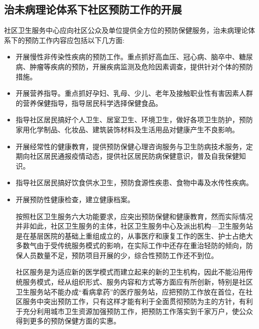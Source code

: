 \subsection{治未病理论体系下社区预防工作的开展}
社区卫生服务中心应向社区公众及单位提供全方位的预防保健服务，治未病理论体系下的预防工作内容应包括以下几方面:
\begin{itemize}
\item 开展慢性非传染性疾病的预防工作。重点抓好高血压、冠心病、脑卒中、糖尿病、肿瘤等疾病的预防，开展疾病监测及危险因素调查，提供针对个体的预防措施。
\item 开展营养指导。重点抓好孕妇、乳母、少儿、老年及接触职业性有害因素人群的营养保健指导，指导居民科学选择保健食品。
\item 指导社区居民搞好个人卫生、居室卫生、环境卫生，做好各项卫生防护，预防家用化学制品、化妆品、建筑装饰材料及生活用品对健康产生不良影响。
\item 开展经常性的健康教育，提供预防保健心理咨询服务与卫生防病技术服务，定期向社区居民通报疫情动态，提供社区居民防病保健意识，普及自我保健知识。
\item 指导社区居民搞好饮食供水卫生，预防食源性疾患、食物中毒及水传性疾病。
\item 开展预防性健康检查，建立健康档案。

按照杜区卫生服务六大功能要求，应突出预防保健和健康教育，然而实际情况并非如此，社区卫生服务的主体，社区卫生服务中心及派出机构—卫生服务站是在基层医院的基础上重组成立的，从事医疗和康复工作的医生、护士占绝大多数气由于受传统服务模式的影响，在实际工作中还存在重治轻防的倾向，防保人员数量不足，预防项目开展的少，综合性预防工作还不到位。

社区服务是为适应新的医学模式而建立起来的新的卫生机构，因此不能沿用传统服务模式，经从组织形式、服务内容和方式等方面应有所创新，特别是社区卫生服务站不能办成“看病拿药”的医疗服务站，应把预防工作放在首位，在社区服务中突出预防工作，只有这样才能有利于全面贯彻预防为主的方针，有利于充分利用城市卫生资源加强预防工作，把预防工作落实到千家万户，使公众得到更多的预防保健方面的实惠。
\end{itemize}





